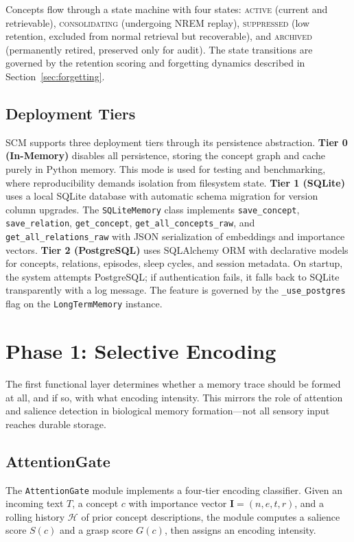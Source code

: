 \documentclass[11pt,twocolumn]{article}
\begin{document}
Concepts flow through a state machine with four states: \textsc{active} (current and retrievable), \textsc{consolidating} (undergoing NREM replay), \textsc{suppressed} (low retention, excluded from normal retrieval but recoverable), and \textsc{archived} (permanently retired, preserved only for audit). The state transitions are governed by the retention scoring and forgetting dynamics described in Section~\ref{sec:forgetting}.

\subsection{Deployment Tiers}

SCM supports three deployment tiers through its persistence abstraction. \textbf{Tier 0 (In-Memory)} disables all persistence, storing the concept graph and cache purely in Python memory. This mode is used for testing and benchmarking, where reproducibility demands isolation from filesystem state. \textbf{Tier 1 (SQLite)} uses a local SQLite database with automatic schema migration for version column upgrades. The \texttt{SQLiteMemory} class implements \texttt{save\_concept}, \texttt{save\_relation}, \texttt{get\_concept}, \texttt{get\_all\_concepts\_raw}, and \texttt{get\_all\_relations\_raw} with JSON serialization of embeddings and importance vectors. \textbf{Tier 2 (PostgreSQL)} uses SQLAlchemy ORM with declarative models for concepts, relations, episodes, sleep cycles, and session metadata. On startup, the system attempts PostgreSQL; if authentication fails, it falls back to SQLite transparently with a log message. The feature is governed by the \texttt{\_use\_postgres} flag on the \texttt{LongTermMemory} instance.

\section{Phase 1: Selective Encoding}

The first functional layer determines whether a memory trace should be formed at all, and if so, with what encoding intensity. This mirrors the role of attention and salience detection in biological memory formation---not all sensory input reaches durable storage.

\subsection{AttentionGate}

The \texttt{AttentionGate} module implements a four-tier encoding classifier. Given an incoming text $T$, a concept $c$ with importance vector $\mathbf{I} = (n, e, t, r)$, and a rolling history $\mathcal{H}$ of prior concept descriptions, the module computes a salience score $S(c)$ and a grasp score $G(c)$, then assigns an encoding intensity.
\end{document}

